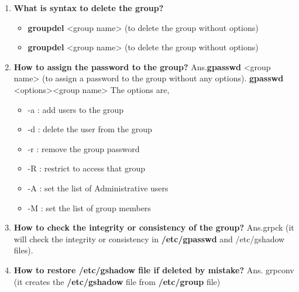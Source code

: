 \begin{enumerate}
    \bigskip
    \bigskip

    \item\textbf{What is syntax to delete the group?}  
    \newline
      \begin{itemize}
        \item \textbf{groupdel}    <group name>	(to delete the group without options)
        \item \textbf{groupdel}   <group name>	(to delete the group without options)
       \end{itemize}
       
    \bigskip
    \bigskip
    
    \item\textbf{How to assign the password to the group?}
    \newline
    Ans.\textbf{gpasswd} <group name>	(to assign a password to the group without any options).
        \textbf{gpasswd}    <options><group name>
        The options are,            \begin{itemize}
             	                      \item -a :  add users to the group
				       	              \item -d :  delete the user from the group
					                  \item -r :  remove the group password
					                  \item -R :  restrict to access that group
					                  \item -A : set the list of Administrative users
					                  \item -M :  set the list of group members
                                    \end{itemize}

    \bigskip
    \bigskip

    \item\textbf{How to check the integrity or consistency of the group?}
    \newline
    Ans.grpck	(it will check the integrity or consistency in  \textbf{/etc/gpasswd }  and   /etc/gshadow   files).

    \bigskip
    \bigskip

    \item\textbf{How to restore  /etc/gshadow file if deleted by mistake?}
    \newline
    Ans. grpconv	(it creates the  \textbf{/etc/gshadow}  file  from   \textbf{/etc/group}   file)
    

\end{enumerate}
